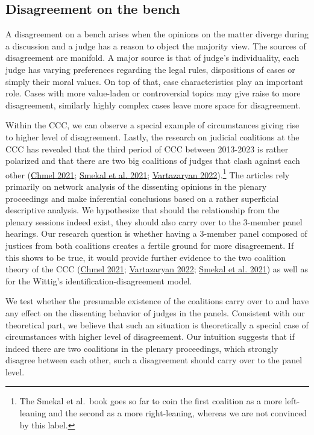 \documentclass[
  11pt,
]{article}
\begin{document}
\hypertarget{disagreement-on-the-bench}{%
\subsection{Disagreement on the bench}\label{disagreement-on-the-bench}}

A disagreement on a bench arises when the opinions on the matter diverge
during a discussion and a judge has a reason to object the majority
view. The sources of disagreement are manifold. A major source is that
of judge's individuality, each judge has varying preferences regarding
the legal rules, dispositions of cases or simply their moral values. On
top of that, case characteristics play an important role. Cases with
more value-laden or controversial topics may give raise to more
disagreement, similarly highly complex cases leave more space for
disagreement.

Within the CCC, we can observe a special example of circumstances giving
rise to higher level of disagreement. Lastly, the research on judicial
coalitions at the CCC has revealed that the third period of CCC between
2013-2023 is rather polarized and that there are two big coalitions of
judges that clash against each other
(\protect\hyperlink{ref-chmelCoOvlivnujeUstavni2021}{Chmel 2021};
\protect\hyperlink{ref-smekalMimopravniVlivyNa2021}{Smekal et al. 2021};
\protect\hyperlink{ref-vartazaryanSitOvaAnalyza2022}{Vartazaryan
2022}).\footnote{The Smekal et al.~book goes so far to coin the first
  coalition as a more left-leaning and the second as a more
  right-leaning, whereas we are not convinced by this label.} The
articles rely primarily on network analysis of the dissenting opinions
in the plenary proceedings and make inferential conclusions based on a
rather superficial descriptive analysis. We hypothesize that should the
relationship from the plenary sessions indeed exist, they should also
carry over to the 3-member panel hearings. Our research question is
whether having a 3-member panel composed of justices from both
coalitions creates a fertile ground for more disagreement. If this shows
to be true, it would provide further evidence to the two coalition
theory of the CCC
(\protect\hyperlink{ref-chmelCoOvlivnujeUstavni2021}{Chmel 2021};
\protect\hyperlink{ref-vartazaryanSitOvaAnalyza2022}{Vartazaryan 2022};
\protect\hyperlink{ref-smekalMimopravniVlivyNa2021}{Smekal et al. 2021})
as well as for the Wittig's identification-disagreement model.

We test whether the presumable existence of the coalitions carry over to
and have any effect on the dissenting behavior of judges in the panels.
Consistent with our theoretical part, we believe that such an situation
is theoretically a special case of circumstances with higher level of
disagreement. Our intuition suggests that if indeed there are two
coalitions in the plenary proceedings, which strongly disagree between
each other, such a disagreement should carry over to the panel level.
\end{document}
